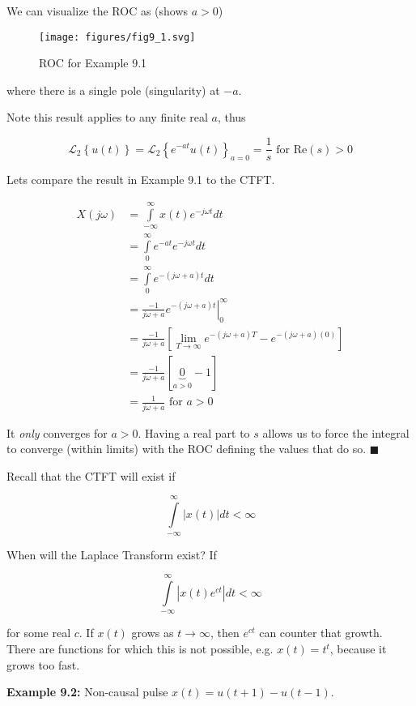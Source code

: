\documentclass{article}
\begin{document}
We can visualize the ROC as (shows $a > 0$)

\begin{figure}
  \centering
  \texttt{[image: figures/fig9\_1.svg]}
  \caption{ROC for Example 9.1}
\end{figure}

where there is a single pole (singularity) at $-a$.

Note this result applies to any finite real $a$, thus

\[
\mathcal{L}_2\left\{ u(t) \right\} = \mathcal{L}_2\left\{ e^{-at} u(t) \right\}_{a = 0} = \frac{1}{s} \text{ for Re}(s) > 0 
\]

Lets compare the result in Example 9.1 to the CTFT.

\begin{align}
  X(j\omega) &= \int\limits_{-\infty}^{\infty} x(t) e^{-j\omega t} dt\\
  &= \int\limits_{0}^{\infty} e^{-at} e^{-j\omega t} dt\\
  &= \int\limits_{0}^{\infty} e^{-(j\omega+a)t} dt\\
  &= \left. \frac{-1}{j\omega+a} e^{-(j\omega+a)t} \right|_{0}^{\infty}\\
  &= \frac{-1}{j\omega+a} \left[\lim_{T\rightarrow \infty} e^{-(j\omega+a)T} - e^{-(j\omega+a)(0)} \right]\\
  &= \frac{-1}{j\omega+a} \left[\underbrace{0}_{a > 0} - 1\right]\\
  &= \frac{1}{j\omega+a} \text{ for } a > 0
\end{align}

It \textit{only} converges for $a > 0$. Having a real part to $s$ allows us to force the integral to converge (within limits) with the ROC defining the values that do so. $\blacksquare$



Recall that the CTFT will exist if

\[
\int\limits_{-\infty}^{\infty}\left| x(t) \right| dt < \infty 
\]

When will the Laplace Transform exist? If

\[
\int\limits_{-\infty}^{\infty}\left| x(t)e^{ct} \right| dt < \infty 
\]

for some real $c$. If $x(t)$ grows as $t\rightarrow \infty$, then $e^{ct}$ can counter that growth. There are functions for which this is not possible, e.g. $x(t) = t^t$, because it grows too fast.

\textbf{Example 9.2:} Non-causal pulse $x(t) = u(t+1) - u(t-1)$.
\end{document}
